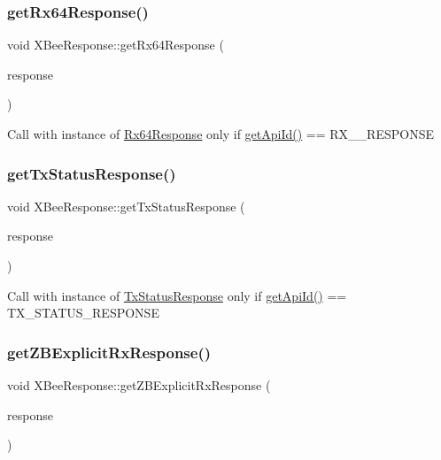 \subsubsection{\texorpdfstring{get\+Rx64\+Response()}{getRx64Response()}}
{\footnotesize\ttfamily void X\+Bee\+Response\+::get\+Rx64\+Response (\begin{DoxyParamCaption}\item[{\hyperlink{class_x_bee_response}{X\+Bee\+Response} \&}]{response }\end{DoxyParamCaption})}

Call with instance of \hyperlink{class_rx64_response}{Rx64\+Response} only if \hyperlink{class_x_bee_response_a4a9677e3b39054119fa278d1ad52130a}{get\+Api\+Id()} == R\+X\+\_\+\_\+\+R\+E\+S\+P\+O\+N\+SE \hypertarget{class_x_bee_response_a2fd9882d767d48e679a7595b780c2a2d}{}\label{class_x_bee_response_a2fd9882d767d48e679a7595b780c2a2d} 
\subsubsection{\texorpdfstring{get\+Tx\+Status\+Response()}{getTxStatusResponse()}}
{\footnotesize\ttfamily void X\+Bee\+Response\+::get\+Tx\+Status\+Response (\begin{DoxyParamCaption}\item[{\hyperlink{class_x_bee_response}{X\+Bee\+Response} \&}]{response }\end{DoxyParamCaption})}

Call with instance of \hyperlink{class_tx_status_response}{Tx\+Status\+Response} only if \hyperlink{class_x_bee_response_a4a9677e3b39054119fa278d1ad52130a}{get\+Api\+Id()} == T\+X\+\_\+\+S\+T\+A\+T\+U\+S\+\_\+\+R\+E\+S\+P\+O\+N\+SE \hypertarget{class_x_bee_response_a007fe3ffddf5ee83db25654654e79728}{}\label{class_x_bee_response_a007fe3ffddf5ee83db25654654e79728} 
\subsubsection{\texorpdfstring{get\+Z\+B\+Explicit\+Rx\+Response()}{getZBExplicitRxResponse()}}
{\footnotesize\ttfamily void X\+Bee\+Response\+::get\+Z\+B\+Explicit\+Rx\+Response (\begin{DoxyParamCaption}\item[{\hyperlink{class_x_bee_response}{X\+Bee\+Response} \&}]{response }\end{DoxyParamCaption})}

